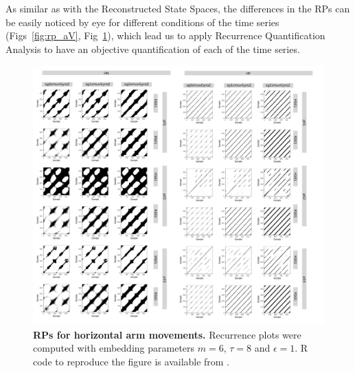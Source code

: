 As similar as with the Reconstructed State Spaces, 
the differences in the RPs can be easily noticed by eye 
for different conditions of the time series (Figs~\ref{fig:rp_aV}, Fig~\ref{fig:rp_aH}),
which lead us to apply Recurrence Quantification Analysis 
to have an objective quantification of each of the time series.
\begin{figure}[!h]
\centering
\includegraphics[width=1.0\textwidth]{rp_aH}
\caption{
	{\bf RPs for horizontal arm movements.}	
	Recurrence plots were computed with 
	embedding parameters $m=6$, $\tau=8$ and $\epsilon=1$.
	R code to reproduce the figure is available from \cite{hwum2018}.
        }
    \label{fig:rp_aH}
\end{figure}
